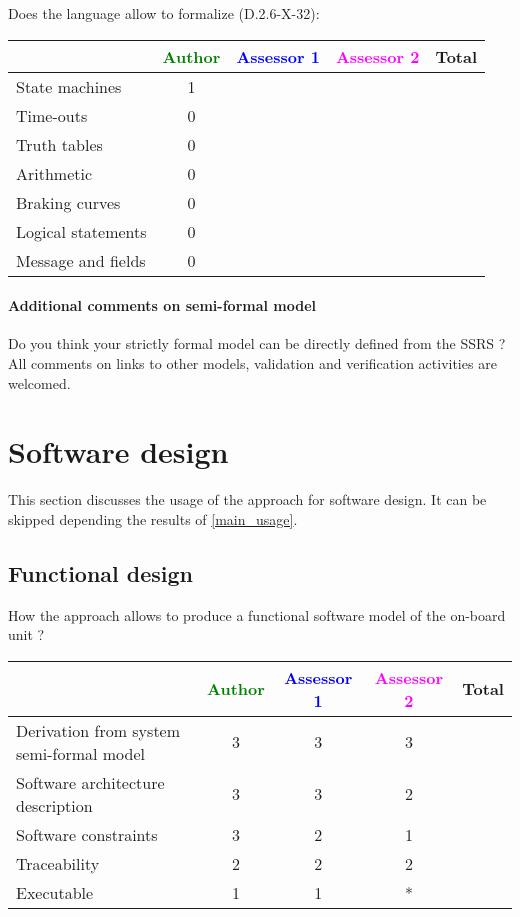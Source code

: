 Does the language allow to formalize (D.2.6-X-32):

\begin{tabular}{|l | c | c | c | c|}
\hline
& \textcolor{green}{Author} & \textcolor{blue}{Assessor 1} & \textcolor{magenta}{Assessor 2} & Total \\
\hline
State machines & 1 & & & \\
\hline
Time-outs & 0 &  & & \\
\hline
Truth tables & 0 & & & \\
\hline
Arithmetic & 0 & & & \\
\hline
Braking curves & 0 & & & \\
\hline
Logical statements & 0 & & & \\
\hline
Message and fields & 0 & & & \\
\hline
\end{tabular}

\paragraph{Additional comments on semi-formal model} Do you think your strictly formal model can be directly defined from the SSRS ?
All comments on links to other models, validation and verification activities are welcomed.

\section{Software design}
This section discusses the usage of the approach for software design.
It can be skipped depending the results of \ref{main_usage}.

\subsection{Functional design}

How the approach allows to produce a functional software model of the on-board unit ?

\begin{tabular}{|l | c | c | c | c|}
\hline
& \textcolor{green}{Author} & \textcolor{blue}{Assessor 1} & \textcolor{magenta}{Assessor 2} & Total \\
\hline
Derivation from system semi-formal model & 3 & 3 & 3 & \\
\hline
Software architecture description & 3 & 3 & 2 & \\
\hline
Software constraints & 3 & 2 & 1 & \\
\hline
Traceability & 2 & 2 & 2 & \\
\hline
Executable & 1 & 1 & * & \\
\hline
\end{tabular}



